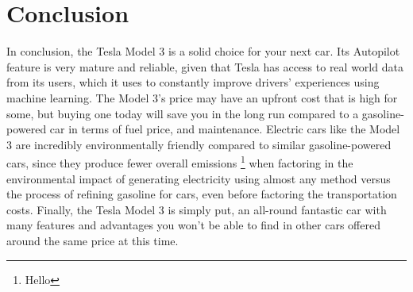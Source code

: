\documentclass{IEEEtran}
\begin{document}
  \section{Conclusion}
  In conclusion, the Tesla Model 3 is a solid choice for your next car.
  Its Autopilot feature is very mature and reliable, given that Tesla has access to
  real world data from its users, which it uses to constantly improve drivers'
  experiences using machine learning. The Model 3's price may have an upfront cost
  that is high for some, but buying one today will save you in the long run
  compared to a gasoline-powered car in terms of fuel price, and maintenance.
  Electric cars like the Model 3 are incredibly environmentally friendly compared
  to similar gasoline-powered cars, since they produce fewer overall emissions \footnote{Hello}
  when factoring in the environmental impact of generating electricity using
  almost any method versus the process of refining gasoline for cars, even before
  factoring the transportation costs. Finally, the Tesla Model 3 is simply put,
  an all-round fantastic car with many features and advantages you won't be able
  to find in other cars offered around the same price at this time.

\end{document}
